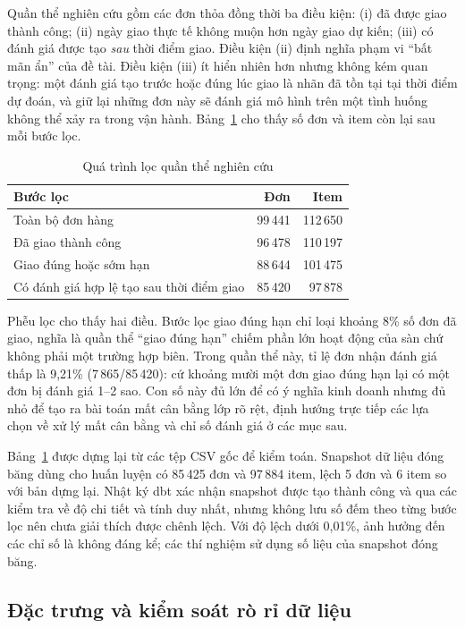 \documentclass[12pt,a4paper]{report}
\begin{document}
Quần thể nghiên cứu gồm các đơn thỏa đồng thời ba điều kiện: (i) đã được giao thành công; (ii) ngày giao thực tế không muộn hơn ngày giao dự kiến; (iii) có đánh giá được tạo \emph{sau} thời điểm giao. Điều kiện (ii) định nghĩa phạm vi ``bất mãn ẩn'' của đề tài. Điều kiện (iii) ít hiển nhiên hơn nhưng không kém quan trọng: một đánh giá tạo trước hoặc đúng lúc giao là nhãn đã tồn tại tại thời điểm dự đoán, và giữ lại những đơn này sẽ đánh giá mô hình trên một tình huống không thể xảy ra trong vận hành. Bảng~\ref{tab:funnel} cho thấy số đơn và item còn lại sau mỗi bước lọc.

\begin{table}[htbp]\centering\small
\caption{Quá trình lọc quần thể nghiên cứu}\label{tab:funnel}
\begin{tabular}{lrr}
\toprule
Bước lọc & Đơn & Item \\
\midrule
Toàn bộ đơn hàng                          & 99\,441 & 112\,650 \\
Đã giao thành công                        & 96\,478 & 110\,197 \\
Giao đúng hoặc sớm hạn                    & 88\,644 & 101\,475 \\
Có đánh giá hợp lệ tạo sau thời điểm giao & 85\,420 &  97\,878 \\
\bottomrule
\end{tabular}
\end{table}

Phễu lọc cho thấy hai điều. Bước lọc giao đúng hạn chỉ loại khoảng 8\% số đơn đã giao, nghĩa là quần thể ``giao đúng hạn'' chiếm phần lớn hoạt động của sàn chứ không phải một trường hợp biên. Trong quần thể này, tỉ lệ đơn nhận đánh giá thấp là 9,21\% (7\,865/85\,420): cứ khoảng mười một đơn giao đúng hạn lại có một đơn bị đánh giá 1--2 sao. Con số này đủ lớn để có ý nghĩa kinh doanh nhưng đủ nhỏ để tạo ra bài toán mất cân bằng lớp rõ rệt, định hướng trực tiếp các lựa chọn về xử lý mất cân bằng và chỉ số đánh giá ở các mục sau.

Bảng~\ref{tab:funnel} được dựng lại từ các tệp CSV gốc để kiểm toán. Snapshot dữ liệu đóng băng dùng cho huấn luyện có 85\,425 đơn và 97\,884 item, lệch 5 đơn và 6 item so với bản dựng lại. Nhật ký dbt xác nhận snapshot được tạo thành công và qua các kiểm tra về độ chi tiết và tính duy nhất, nhưng không lưu số đếm theo từng bước lọc nên chưa giải thích được chênh lệch. Với độ lệch dưới 0,01\%, ảnh hưởng đến các chỉ số là không đáng kể; các thí nghiệm sử dụng số liệu của snapshot đóng băng.

\subsection{Đặc trưng và kiểm soát rò rỉ dữ liệu}
\end{document}
